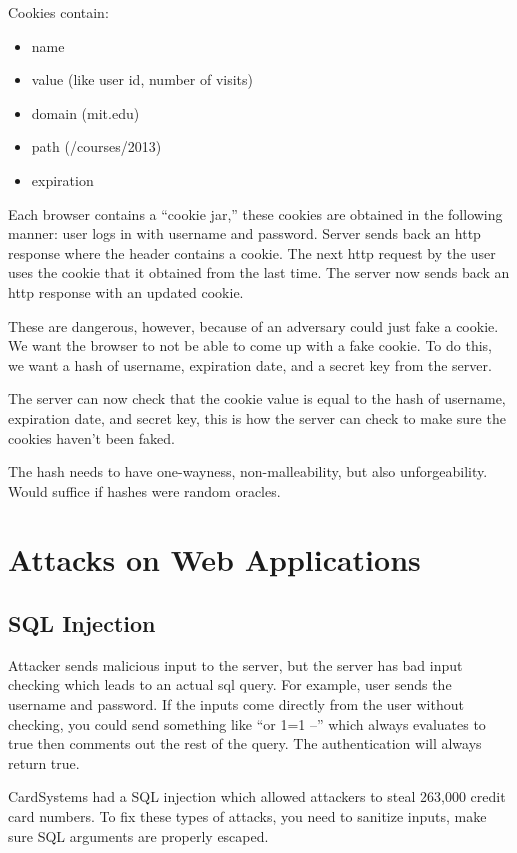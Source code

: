 \documentclass[psamsfonts]{amsart}
\begin{document}
Cookies contain:
\begin{itemize}
  \item name
  \item value (like user id, number of visits)
  \item domain (mit.edu)
  \item path (/courses/2013)
  \item expiration
\end{itemize}

Each browser contains a ``cookie jar,'' these cookies are obtained in the following manner: user logs in with username and password. Server sends back an http response where the header contains a cookie. The next http request by the user uses the cookie that it obtained from the last time. The server now sends back an http response with an updated cookie.

These are dangerous, however, because of an adversary could just fake a cookie. We want the browser to not be able to come up with a fake cookie. To do this, we want a hash of username, expiration date, and a secret key from the server.

The server can now check that the cookie value is equal to the hash of username, expiration date, and secret key, this is how the server can check to make sure the cookies haven't been faked.

The hash needs to have one-wayness, non-malleability, but also unforgeability. Would suffice if hashes were random oracles.

\section{Attacks on Web Applications}

\subsection{SQL Injection}

Attacker sends malicious input to the server, but the server has bad input checking which leads to an actual sql query. For example, user sends the username and password. If the inputs come directly from the user without checking, you could send something like ``or 1=1 --'' which always evaluates to true then comments out the rest of the query. The authentication will always return true.

CardSystems had a SQL injection which allowed attackers to steal 263,000 credit card numbers. To fix these types of attacks, you need to sanitize inputs, make sure SQL arguments are properly escaped.
\end{document}
